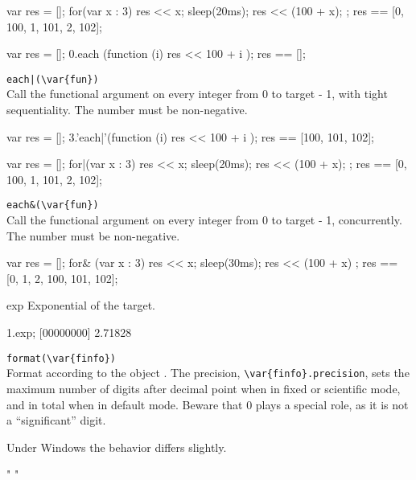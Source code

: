 \begin{urbiscriptapi}
\begin{urbiassert}
{
  var res = [];
  for(var x : 3) { res << x; sleep(20ms); res << (100 + x); };
  res
}
== [0, 100, 1, 101, 2, 102];

{
  var res = [];
  0.each (function (i) { res << 100 + i });
  res
}
== [];
\end{urbiassert}

\item \lstinline'each|(\var{fun})'\\
  Call the functional argument  on every integer from 0 to
  target - 1, with tight sequentiality.  The number must be
  non-negative.
\begin{urbiassert}
{
  var res = [];
  3.'each|'(function (i) { res << 100 + i });
  res
}
== [100, 101, 102];

{
  var res = [];
  for|(var x : 3) { res << x; sleep(20ms); res << (100 + x); };
  res
}
== [0, 100, 1, 101, 2, 102];
\end{urbiassert}%

\item \lstinline|each&(\var{fun})|\\
  Call the functional argument  on every integer from 0 to
  target - 1, concurrently.  The number must be non-negative.
\begin{urbiassert}
{
  var res = [];
  for& (var x : 3) { res << x; sleep(30ms); res << (100 + x) };
  res
}
== [0, 1, 2, 100, 101, 102];
\end{urbiassert}%

\item[exp]
  Exponential of the target.
\begin{urbiscript}
1.exp;
[00000000] 2.71828
\end{urbiscript}

\item \lstinline|format(\var{finfo})|\\
  Format according to the  object .
  The precision, \lstinline|\var{finfo}.precision|, sets the maximum
  number of digits after decimal point when in fixed or scientific
  mode, and in total when in default mode.  Beware that 0 plays a
  special role, as it is not a ``significant'' digit.

  \begin{windows}
    Under Windows the behavior differs slightly.
  \end{windows}
\begin{urbiassert}
"%
"%


\end{urbiassert}
\end{urbiscriptapi}
